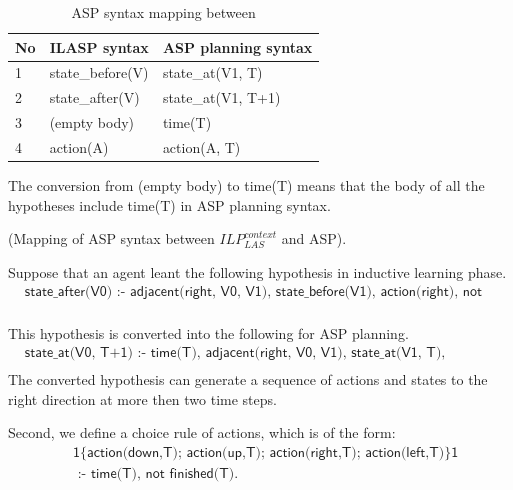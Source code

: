 \begin{table}[H]
\centering
\begin{tabular}{|l|p{5cm}|p{5cm}|}
\hline
No & ILASP syntax & ASP planning syntax\\ \hline
1 & \textsf{state\_before(V)} & \textsf{state\_at(V1, T)}  \\ \hline
2 & \textsf{state\_after(V)} & \textsf{state\_at(V1, T+1)}  \\ \hline
3 & \textsf{(empty body)} & \textsf{time(T)}  \\ \hline
4 & \textsf{action(A)} & \textsf{action(A, T)}  \\ \hline
\end{tabular}
\caption{ASP syntax mapping between }
\label{table:extension_specification}
\end{table}
The conversion from (empty body) to \textsf{time(T)} means that the body of all the hypotheses include \textsf{time(T)} in ASP planning syntax.
\begin{examp} \normalfont (Mapping of ASP syntax between $ILP_{LAS}^{context}$ and ASP).

Suppose that an agent leant the following hypothesis in inductive learning phase. 
\begin{equation*}
\begin{split}
&\textsf{state\_after(V0) :- adjacent(right, V0, V1), state\_before(V1), action(right), not wall(V0).}\\
\end{split}
\end{equation*}

This hypothesis is converted into the following for ASP planning.
\begin{equation*}
\begin{split}
&\textsf{state\_at(V0, T+1) :- time(T), adjacent(right, V0, V1), state\_at(V1, T), action(right, T), not wall(V0).}\\
\end{split}
\end{equation*}
The converted hypothesis can generate a sequence of actions and states to the right direction at more then two time steps.
\end{examp}

Second, we define a choice rule of actions, which is of the form:
\begin{equation}\label{eq:choice_rule}
\begin{split}
&\textsf{1\{action(down,T); action(up,T); action(right,T); action(left,T)\}1} \\
&\textsf{ :- time(T), not finished(T).}\\
\end{split}
\end{equation}

